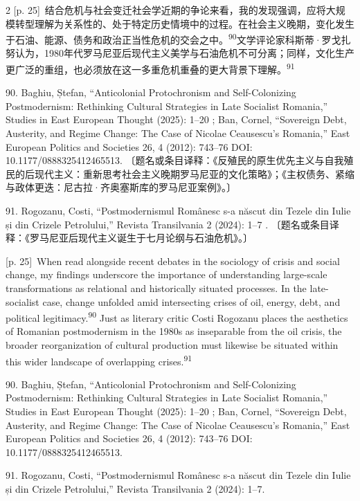 \documentclass[10pt,a4paper]{article}
\begin{document}
\begin{paracol}{2}
{\scriptsize\color{gray} [p. 25]}\ 结合危机与社会变迁社会学近期的争论来看，我的发现强调，应将大规模转型理解为关系性的、处于特定历史情境中的过程。在社会主义晚期，变化发生于石油、能源、债务和政治正当性危机的交会之\mbox{中。\textsuperscript{90}}文学评论家科斯蒂·罗戈扎努认为，1980年代罗马尼亚后现代主义美学与石油危机不可分离；同样，文化生产更广泛的重组，也必须放在这一多重危机重叠的更大背景下理\mbox{解。\textsuperscript{91}}\par{\small 90. Baghiu, Ștefan, “Anticolonial Protochronism and Self-Colonizing Postmodernism: Rethinking Cultural Strategies in Late Socialist Romania,” Studies in East European Thought (2025): 1–20 ; Ban, Cornel, “Sovereign Debt, Austerity, and Regime Change: The Case of Nicolae Ceausescu’s Romania,” East European Politics and Societies 26, 4 (2012): 743–76 DOI: 10.1177/0888325412465513. 〔题名或条目译释：《反殖民的原生优先主义与自我殖民的后现代主义：重新思考社会主义晚期罗马尼亚的文化策略》；《主权债务、紧缩与政体更迭：尼古拉·齐奥塞斯库的罗马尼亚案例》。〕\par}{\small 91. Rogozanu, Costi, “Postmodernismul Românesc s-a născut din Tezele din Iulie și din Crizele Petrolului,” Revista Transilvania 2 (2024): 1–7 . 〔题名或条目译释：《罗马尼亚后现代主义诞生于七月论纲与石油危机》。〕\par}
\switchcolumn
{\scriptsize\color{gray} [p. 25]}\ When read alongside recent debates in the sociology of crisis and social change, my findings underscore the importance of understanding large-scale transformations as relational and historically situated processes. In the late-socialist case, change unfolded amid intersecting crises of oil, energy, debt, and political legitimacy.\nobreak\textsuperscript{90} Just as literary critic Costi Rogozanu places the aesthetics of Romanian postmodernism in the 1980s as inseparable from the oil crisis, the broader reorganization of cultural production must likewise be situated within this wider landscape of overlapping crises.\nobreak\textsuperscript{91}\par{\small 90. Baghiu, Ștefan, “Anticolonial Protochronism and Self-Colonizing Postmodernism: Rethinking Cultural Strategies in Late Socialist Romania,” Studies in East European Thought (2025): 1–20 ; Ban, Cornel, “Sovereign Debt, Austerity, and Regime Change: The Case of Nicolae Ceausescu’s Romania,” East European Politics and Societies 26, 4 (2012): 743–76 DOI: 10.1177/0888325412465513.\par}{\small 91. Rogozanu, Costi, “Postmodernismul Românesc s-a născut din Tezele din Iulie și din Crizele Petrolului,” Revista Transilvania 2 (2024): 1–7.\par}

\end{paracol}
\end{document}
